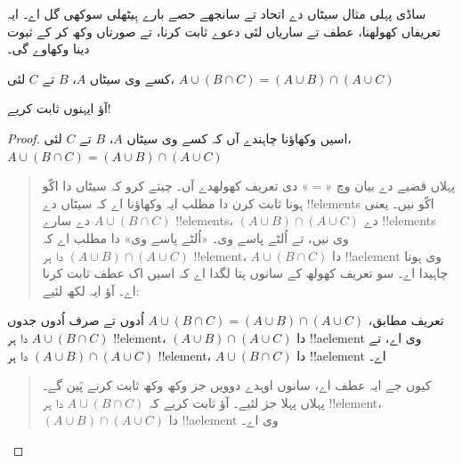 \documentclass[../../../include/open-logic-section]{subfiles}
\begin{document}


ساڈی پہلی مثال سیٹاں دے اتحاد تے سانجھے حصے بارے ہِیٹھلی سوکھی گل اے۔ ایہ تعریفاں کھولھنا، عطف تے ساریاں لئی دعوے ثابت کرنا، تے صورتاں وکھ کر کے ثبوت دینا وکھاوے گی۔

\begin{prop}
کسے وی سیٹاں $A$، $B$ تے $C$ لئی، $A \cup (B \cap C) = (A \cup B)
\cap (A \cup C)$
\end{prop}

آؤ ایہنوں ثابت کریے!{}

\begin{proof}
اسیں وکھاؤنا چاہندے آں کہ کسے وی سیٹاں $A$، $B$ تے $C$ لئی، $A \cup (B \cap
C) = (A \cup B) \cap (A \cup C)$
\begin{quote}
پہلاں قضیے دے بیان وچ «$=$» دی تعریف کھولھدے آں۔ چیتے کرو کہ سیٹاں دا اکّو ہونا ثابت کرن دا مطلب ایہ وکھاؤنا اے کہ سیٹاں دے !!{element}s اکّو نیں۔ یعنی $A \cup
(B \cap C)$ دے سارے !!{element}s، $(A \cup B) \cap (A \cup C)$ دے !!{element}s وی نیں، تے اُلٹے پاسے وی۔ «اُلٹے پاسے وی» دا مطلب اے کہ $(A
\cup B) \cap (A \cup C)$ دا ہر !!{element}، $A \cup (B \cap
C)$ دا !!a{element} وی ہونا چاہیدا اے۔ سو تعریف کھولھ کے سانوں پتا لگدا اے کہ اسیں اک عطف ثابت کرنا اے۔ آؤ ایہ لکھ لئیے:
\end{quote}
تعریف مطابق، $A \cup (B \cap C) = (A \cup B) \cap (A \cup C)$ اُدوں تے صرف اُدوں جدوں $A \cup (B \cap C)$ دا ہر !!{element}، $(A
\cup B) \cap (A \cup C)$ دا !!a{element} وی اے، تے $(A \cup B) \cap (A
\cup C)$ دا ہر !!{element}، $A \cup (B \cap C)$ دا !!a{element} اے۔
\begin{quote}
کیوں جے ایہ عطف اے، سانوں اوہدے دوویں جز وکھ وکھ ثابت کرنے پَین گے۔ پہلاں پہلا جز لئیے۔ آؤ ثابت کریے کہ $A \cup (B \cap C)$ دا ہر !!{element}، $(A
\cup B) \cap (A \cup C)$ دا !!a{element} وی اے۔


\end{quote}
\end{proof}
\end{document}
